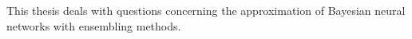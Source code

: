 \documentclass[../thesis.tex]{subfiles}
\begin{document}
This thesis deals with questions concerning the approximation of Bayesian neural networks with ensembling methods.
\end{document}
